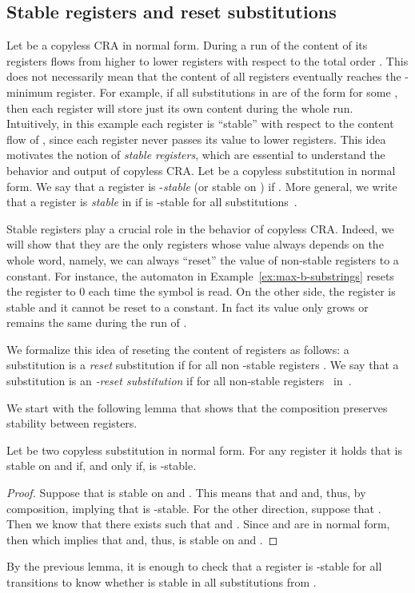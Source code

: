 \subsection{Stable registers and reset substitutions}
\label{subsection:stable_reset}
Let  be a copyless CRA in normal form. 
During a run of  the content of its registers flows from higher to lower registers with respect to the total order . 
This does not necessarily mean that the content of all registers eventually reaches the -minimum register. 
For example, if all substitutions in  are of the form  for some , then each register will store just its own content during the whole run. 
Intuitively, in this example each register is ``stable'' with respect to the content flow of , since each register never passes its value to lower registers.  
This idea motivates the notion of \emph{stable registers}, which are essential to understand the behavior and output of copyless CRA.
Let  be a copyless substitution in normal form.
We say that a register  is -\emph{stable} (or stable on ) if .
More general, we write that a register  is \emph{stable} in  if   is -stable for all substitutions~.

Stable registers play a crucial role in the behavior of copyless CRA. 
Indeed, we will show that they are the only registers whose value always depends on the whole word, namely, we can always ``reset'' the value of non-stable registers to a constant. For instance, the automaton  in Example~\ref{ex:max-b-substrings} resets the register  to 0 each time the symbol  is read. On the other side, the register  is stable and it cannot be reset to a constant. In fact its value only grows or remains the same during the run of .


We formalize this idea of reseting the content of registers as follows: a substitution  is a \emph{reset} substitution if  for all non -stable registers . 
We say that a substitution  is an \emph{-reset substitution} if  for all non-stable registers ~in~.

We start with the following lemma that shows that the composition preserves stability between registers.
\begin{lemma}\label{lemma:stability}
Let  be two copyless substitution in normal form. For any register  it holds that  is stable on  and  if, and only if,  is -stable. 
\end{lemma}
\begin{proof}
Suppose that  is stable on  and . This means that  and  and, thus,  by composition, implying that  is -stable. 
For the other direction, suppose that .
Then we know that there exists  such that  and .
Since  and  are in normal form, then  which implies that  and, thus,  is stable on  and .
\end{proof}
By the previous lemma, it is enough to check that a register  is -stable for all transitions  to know whether  is stable in all substitutions from .

